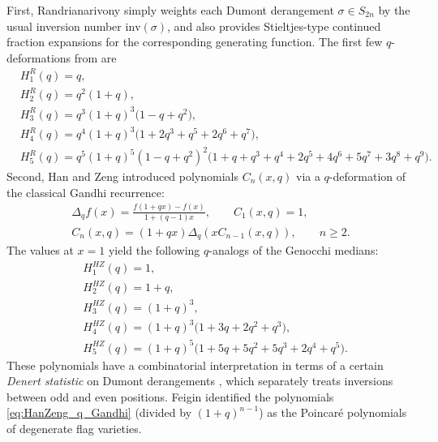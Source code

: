 \documentclass[10pt,a4paper]{amsart}
\numberwithin{equation}{section}
\theoremstyle{definition}
\begin{document}
First, Randrianarivony \cite{Randrianarivony1997} simply weights each Dumont
derangement $\sigma\in S_{2n}$ by the usual inversion number
$\mathrm{inv}(\sigma)$, and also provides Stieltjes-type continued fraction
expansions for the corresponding generating function.
The first few $q$-deformations from \cite{Randrianarivony1997} are
\begin{equation}
	\label{eq:Randrianarivony_q_Gandhi}
	\begin{split}
		&H_1^R(q)= q, \\
		&H_2^R(q)= q^2 (1 + q), \\
		&H_3^R(q)= q^3 (1 + q)^3 \bigl(1 - q + q^2\bigr), \\
		&H_4^R(q)= q^4 (1 + q)^3 \bigl(1 + 2q^3 + q^5 + 2q^6 + q^7\bigr), \\
		&H_5^R(q)= q^5 (1 + q)^5 (1 - q + q^2)^2 \bigl(1 + q + q^3 + q^4 + 2q^5 +
		4q^6 + 5q^7 + 3q^8 + q^9\bigr).
	\end{split}
\end{equation}
Second, Han and Zeng \cite{HanZeng1999,HanZeng1999Discrete}
introduced polynomials $C_n(x,q)$ via a $q$-deformation of the classical Gandhi
recurrence:
\begin{gather*}
	\Delta_q f(x) = \frac{f(1+qx)-f(x)}{1+(q-1)x}, \qquad C_1(x,q)=1, \\
	C_n(x,q) = (1+qx) \Delta_q  ( x C_{n-1}(x,q) ), \qquad n \ge 2.
\end{gather*}
The values at $x=1$ yield the following $q$-analogs of the Genocchi medians:
\begin{equation}
	\label{eq:HanZeng_q_Gandhi}
	\begin{split}
		&H_1^{HZ}(q)= 1, \\
&H_2^{HZ}(q)= 1 + q, \\
&H_3^{HZ}(q)= (1+q)^3, \\
		&H_4^{HZ}(q)= (1+q)^3 \bigl(1 + 3q + 2q^2 + q^3\bigr), \\
		&H_5^{HZ}(q)= (1+q)^5 \bigl(1 + 5q + 5q^2 + 5q^3 + 2q^4 + q^5\bigr).
	\end{split}
\end{equation}
These polynomials have a combinatorial interpretation in terms of a certain
\emph{Denert statistic} on Dumont derangements \cite{HanZeng1999Discrete}, which
separately treats inversions between odd and even positions.
Feigin \cite{Feigin2012} identified the polynomials \eqref{eq:HanZeng_q_Gandhi}
(divided by $(1+q)^{n-1}$) as the Poincar\'e polynomials of degenerate flag
varieties.
\end{document}

